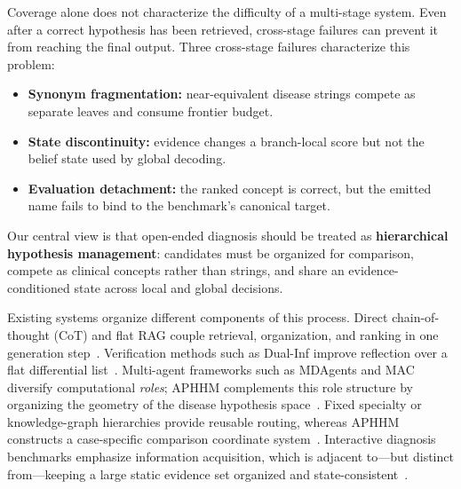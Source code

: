 \documentclass[letterpaper]{article} %
\begin{document}
Coverage alone does not characterize the difficulty of a multi-stage system. Even after a correct hypothesis has been retrieved, cross-stage failures can prevent it from reaching the final output.
Three cross-stage failures characterize this problem:
\begin{itemize}
  \item \textbf{Synonym fragmentation:} near-equivalent disease strings compete as separate leaves and consume frontier budget.
  \item \textbf{State discontinuity:} evidence changes a branch-local score but not the belief state used by global decoding.
  \item \textbf{Evaluation detachment:} the ranked concept is correct, but the emitted name fails to bind to the benchmark's canonical target.
\end{itemize}
Our central view is that open-ended diagnosis should be treated as \textbf{hierarchical hypothesis management}: candidates must be organized for comparison, compete as clinical concepts rather than strings, and share an evidence-conditioned state across local and global decisions.

Existing systems organize different components of this process.
Direct chain-of-thought (CoT) and flat RAG couple retrieval, organization, and ranking in one generation step~\cite{wei2022cot,medrag,imedrag}.
Verification methods such as Dual-Inf improve reflection over a flat differential list~\cite{dualinf2025}.
Multi-agent frameworks such as MDAgents and MAC diversify computational \emph{roles}; APHHM complements this role structure by organizing the geometry of the disease hypothesis space~\cite{mdagents,chen2025mac,mac2026}.
Fixed specialty or knowledge-graph hierarchies provide reusable routing, whereas APHHM constructs a case-specific comparison coordinate system~\cite{kg4diagnosis}.
Interactive diagnosis benchmarks emphasize information acquisition, which is adjacent to---but distinct from---keeping a large static evidence set organized and state-consistent~\cite{sdbench2025,meddxagent2025}.
\end{document}
